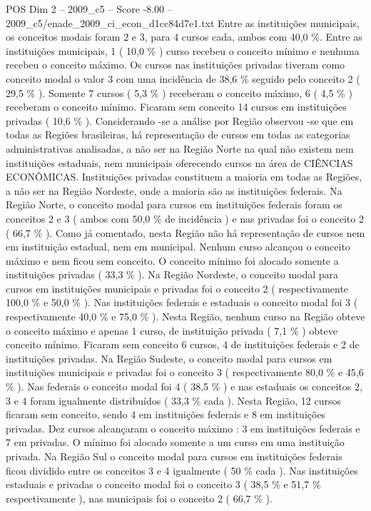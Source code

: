 \begin{textsample}{POS Dim 2 – 2009\_c5 – Score -8.00 – 2009\_c5/enade\_2009\_ci\_econ\_d1cc84d7e1.txt}
Entre as instituições municipais, os conceitos modais foram 2 e 3, para 4 cursos cada, ambos com 40,0 \%.
Entre as instituições municipais, 1 ( 10,0 \% ) curso recebeu o conceito mínimo e nenhuma recebeu o conceito máximo.
Os cursos nas instituições privadas tiveram como conceito modal o valor 3 com uma incidência de 38,6 \% seguido pelo conceito 2 ( 29,5 \% ).
Somente 7 cursos ( 5,3 \% ) receberam o conceito máximo, 6 ( 4,5 \% ) receberam o conceito mínimo.
Ficaram sem conceito 14 cursos em instituições privadas ( 10,6 \% ).
Considerando -se a análise por Região observou -se que em todas as Regiões brasileiras, há representação de cursos em todas as categorias administrativas analisadas, a não ser na Região Norte na qual não existem nem instituições estaduais, nem municipais oferecendo cursos na área de CIÊNCIAS ECONÔMICAS.
Instituições privadas constituem a maioria em todas as Regiões, a não ser na Região Nordeste, onde a maioria são as instituições federais.
Na Região Norte, o conceito modal para cursos em instituições federais foram os conceitos 2 e 3 ( ambos com 50,0 \% de incidência ) e nas privadas foi o conceito 2 ( 66,7 \% ).
Como já comentado, nesta Região não há representação de cursos nem em instituição estadual, nem em municipal.
Nenhum curso alcançou o conceito máximo e nem ficou sem conceito.
O conceito mínimo foi alocado somente a instituições privadas ( 33,3 \% ).
Na Região Nordeste, o conceito modal para cursos em instituições municipais e privadas foi o conceito 2 ( respectivamente 100,0 \% e 50,0 \% ).
Nas instituições federais e estaduais o conceito modal foi 3 ( respectivamente 40,0 \% e 75,0 \% ).
Nesta Região, nenhum curso na Região obteve o conceito máximo e apenas 1 curso, de instituição privada ( 7,1 \% ) obteve conceito mínimo.
Ficaram sem conceito 6 cursos, 4 de instituições federais e 2 de instituições privadas.
Na Região Sudeste, o conceito modal para cursos em instituições municipais e privadas foi o conceito 3 ( respectivamente 80,0 \% e 45,6 \% ).
Nas federais o conceito modal foi 4 ( 38,5 \% ) e nas estaduais os conceitos 2, 3 e 4 foram igualmente distribuídos ( 33,3 \% cada ).
Nesta Região, 12 cursos ficaram sem conceito, sendo 4 em instituições federais e 8 em instituições privadas.
Dez cursos alcançaram o conceito máximo : 3 em instituições federais e 7 em privadas.
O mínimo foi alocado somente a um curso em uma instituição privada.
Na Região Sul o conceito modal para cursos em instituições federais ficou dividido entre os conceitos 3 e 4 igualmente ( 50 \% cada ).
Nas instituições estaduais e privadas o conceito modal foi o conceito 3 ( 38,5 \% e 51,7 \% respectivamente ), nas municipais foi o conceito 2 ( 66,7 \% ).

\end{textsample}
